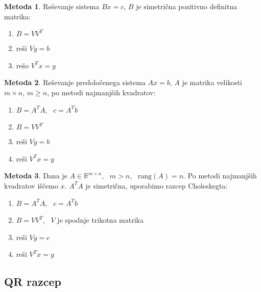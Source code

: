 \documentclass[11pt]{article}
\theoremstyle{definition}
\newtheorem*{metoda}{Metoda}
\begin{document}
\begin{metoda}

Reševanje sistema $Bx = c$, $B$ je simetrična pozitivno definitna matrika:
\begin{enumerate}
	\item $B = V V^T$
	\item reši $V y = b$
	\item rešo $V^T x = y$
\end{enumerate}

\end{metoda}
\vspace{0.5cm}

\begin{metoda}

Reševanje predoločenega sistema $Ax = b$, $A$ je matrika velikosti $m \times n$, $m \geq n$, po metodi najmanjših kvadratov:
\begin{enumerate}
	\item $B = A^T A$, ~$c = A^T b$
	\item $B = V V^T$
	\item reši $V y = b$
	\item reši $V^T x = y$
\end{enumerate}

\end{metoda}
\vspace{0.5cm}

\begin{metoda}

Dana je $A \in \mathbb{R}^{m \times n}$, ~$m > n$, ~$\text{rang}(A) = n$. Po metodi najmanjših kvadratov iščemo $x$. $A^T A$ je simetrična, uporabimo razcep Choleskegta:
\begin{enumerate}
	\item $B = A^T A$, ~$c = A^T b$
	\item $B = V V^T$, ~$V$ je spodnje trikotna matrika
	\item reši $V y = c$
	\item reši $V^T x = y$
\end{enumerate}

\end{metoda}
\vspace{0.5cm}


\subsection{QR razcep}
\vspace{0.5cm}
\end{document}
